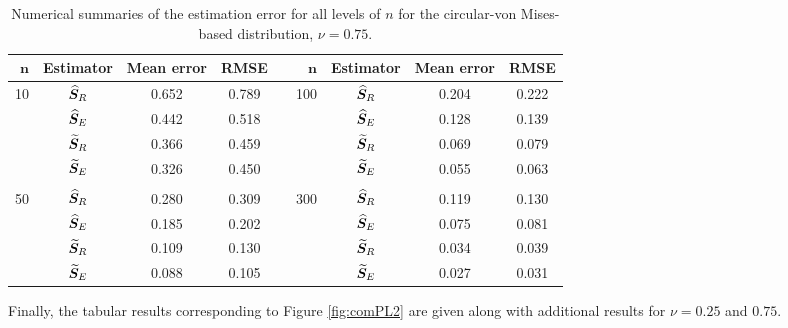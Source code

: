\begin{center}
\begin{table}[h!]
\caption{Numerical summaries of the estimation error for all levels of $n$ for the circular-von Mises-based distribution,  $\nu=0.75$.}  \label{tab:vmnu75}
\begin{tabular}{rccccrccc}
  \hline
 $\mathbf{n}$ & \textbf{Estimator}  & \textbf{Mean error} & \textbf{RMSE} & &$\mathbf{n}$ & \textbf{Estimator} & \textbf{Mean error} & \textbf{RMSE} \\ \hline \hline
   \multirow{4}{*}{10} & ${\widehat{\bm S}_R}$  & 0.652 & 0.789 &  & \multirow{4}{*}{100} & ${\widehat{\bm S}_R}$  & 0.204 & 0.222 \\ 
    & ${\widehat{\bm S}_E}$  & 0.442 & 0.518 &   & & ${\widehat{\bm S}_E}$ & 0.128 & 0.139 \\ 
    & ${\widetilde{\bm S}_R}$  & 0.366 & 0.459 &  &  & ${\widetilde{\bm S}_R}$  & 0.069 & 0.079 \\ 
    & ${\widetilde{\bm S}_E}$  & 0.326 & 0.450 &   & & ${\widetilde{\bm S}_E}$  & 0.055 & 0.063 \\  
    & & & & & & & \\ 
    \multirow{4}{*}{50} & ${\widehat{\bm S}_R}$  & 0.280 & 0.309 &  &  \multirow{4}{*}{300} & ${\widehat{\bm S}_R}$  & 0.119 & 0.130 \\ 
    & ${\widehat{\bm S}_E}$  & 0.185 & 0.202 &  &  & ${\widehat{\bm S}_E}$  & 0.075 & 0.081 \\ 
    & ${\widetilde{\bm S}_R}$  & 0.109 & 0.130 &  & & ${\widetilde{\bm S}_R}$  & 0.034 & 0.039 \\
    & ${\widetilde{\bm S}_E}$ & 0.088 & 0.105 &  &  & ${\widetilde{\bm S}_E}$ & 0.027 & 0.031 \\ 
   \hline
\end{tabular}
\end{table}
\end{center}

Finally, the tabular results corresponding to Figure \ref{fig:comPL2} are given along with additional results for $\nu=0.25$ and $0.75$.

